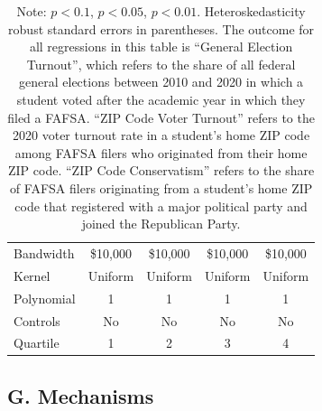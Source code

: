\documentclass[12pt,letterpaper,oneside]{book}
\begin{document}
\begin{table}[h!]
\begin{tabular}{l*{4}{c}}
        \hline
        Bandwidth & \$10,000       &   \$10,000        &   \$10,000        &   \$10,000             \\
        Kernel&   Uniform      &   Uniform        &   Uniform        &      Uniform       \\
        Polynomial&   1       &   1        &   1        &   1         \\
        Controls&   No       &   No        &   No        &   No              \\
        Quartile      &   1     &    2      &      3      &   4           \\        \hline
    \end{tabular}
    \caption*{\footnotesize Note: \sym{+} \(p<0.1\), \sym{*} \(p<0.05\), \sym{**} \(p<0.01\). Heteroskedasticity robust standard errors in parentheses. The outcome for all regressions in this table is ``General Election Turnout'', which refers to the share of all federal general elections between 2010 and 2020 in which a student voted after the academic year in which they filed a FAFSA. ``ZIP Code Voter Turnout'' refers to the 2020 voter turnout rate in a student's home ZIP code among FAFSA filers who originated from their home ZIP code. ``ZIP Code Conservatism'' refers to the share of FAFSA filers originating from a student's home ZIP code that registered with a major political party and joined the Republican Party.}
\end{table}

\clearpage






\subsection*{G. Mechanisms}\label{sec:appendixd}
\end{document}
